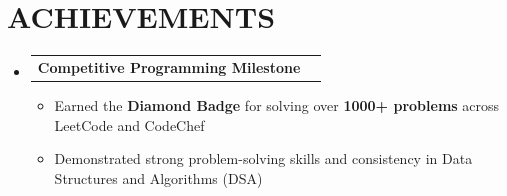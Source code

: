 \documentclass[letterpaper,10pt]{article}
\makeatletter
\newcommand{\resumeItem}[1]{
  \item\small{
    {#1 \vspace{-1pt}}
  }
}
\newcommand{\resumeProjectHeading}[2]{
    \item
    \begin{tabular*}{\textwidth}{l@{\extracolsep{\fill}}r}
      #1 & {\color{dark-grey}\small #2} \\
    \end{tabular*}\vspace{-4pt}
}
\newcommand{\resumeSubHeadingListStart}{\begin{itemize}[leftmargin=0in, label={}]}
\newcommand{\resumeSubHeadingListEnd}{\end{itemize}}
\newcommand{\resumeItemListStart}{\begin{itemize}}
\newcommand{\resumeItemListEnd}{\end{itemize}\vspace{0pt}}
\makeatother
\begin{document}
\section{ACHIEVEMENTS}
    \resumeSubHeadingListStart
        \resumeProjectHeading
          {\textbf{Competitive Programming Milestone}}{}
          \resumeItemListStart
            \resumeItem{Earned the \textbf{Diamond Badge} for solving over \textbf{1000+ problems} across LeetCode and CodeChef}
            \resumeItem{Demonstrated strong problem-solving skills and consistency in Data Structures and Algorithms (DSA)}
          \resumeItemListEnd
    \resumeSubHeadingListEnd

\end{document}
